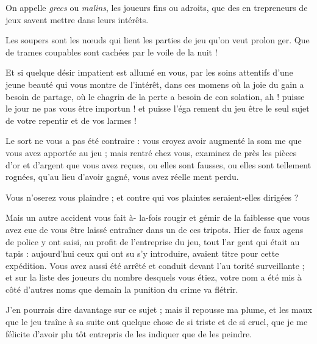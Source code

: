 On appelle \emph{grecs} ou \emph{malins}, les
joueurs fins ou adroits, que des en%
trepreneurs de jeux savent mettre
dans leurs intérêts.

Les soupers sont les nœuds qui lient
les parties de jeu qu'on veut prolon%
ger. Que de trames coupables sont
cachées par le voile de la nuit !

Et si quelque désir impatient est
allumé en vous, par les soins attentifs
d'une jeune beauté qui vous montre
de l'intérêt, dans ces momens où la
joie du gain a besoin de partage, où
le chagrin de la perte a besoin de con%
solation, ah ! puisse le jour ne pas
vous être importun ! et puisse l'éga%
rement du jeu être le seul sujet de
votre repentir et de vos larmes !

Le sort ne vous a pas été contraire :
vous croyez avoir augmenté la som%
me que vous avez apportée au jeu ;
mais rentré chez vous, examinez de 
près les pièces d'or et d'argent que vous
avez reçues, ou elles sont fausses, ou
elles sont tellement rognées, qu'au
lieu d'avoir gagné, vous avez réelle%
ment perdu.

Vous n'oserez vous plaindre ; et
contre qui vos plaintes seraient-elles
dirigées ?

Mais un autre accident vous fait à-%
la-fois rougir et gémir de la faiblesse
que vous avez eue de vous être laissé
entraîner dans un de ces tripots. Hier
de faux agens de police y ont saisi, au
profit de l'entreprise du jeu, tout l'ar%
gent qui était au tapis : aujourd'hui
ceux qui ont su s'y introduire, avaient
titre pour cette expédition. Vous avez
aussi été arrêté et conduit devant l'au%
torité surveillante ; et sur la liste des
joueurs du nombre desquels vous
étiez, votre nom a été mis à côté
d'autres noms que demain la punition
du crime va flétrir.

J'en pourrais dire davantage sur ce
sujet ; mais il repousse ma plume, et
les maux que le jeu traîne à sa suite
ont quelque chose de si triste et de si
cruel, que je me félicite d'avoir plu%
tôt entrepris de les indiquer que de
les peindre.
